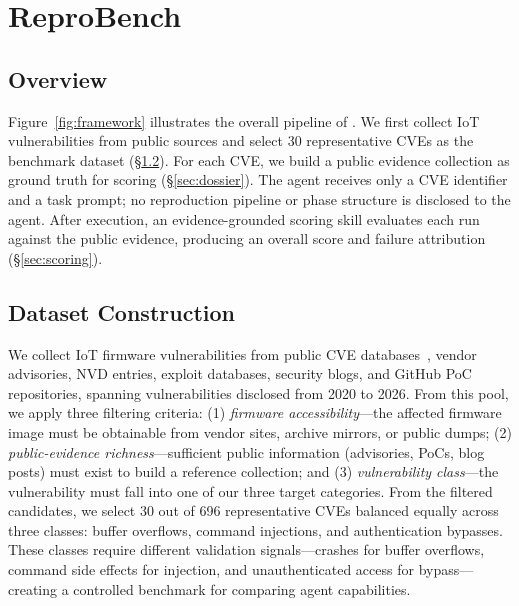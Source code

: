 \section{ReproBench}



\subsection{Overview}
Figure~\ref{fig:framework} illustrates the overall pipeline of \sys{}. We first collect IoT vulnerabilities from public sources and select 30 representative CVEs as the benchmark dataset (\S\ref{sec:dataset}). For each CVE, we build a public evidence collection as ground truth for scoring (\S\ref{sec:dossier}). The agent receives only a CVE identifier and a task prompt; no reproduction pipeline or phase structure is disclosed to the agent. After execution, an evidence-grounded scoring skill evaluates each run against the public evidence, producing an overall score and failure attribution (\S\ref{sec:scoring}).



\subsection{Dataset Construction}
\label{sec:dataset}
We collect IoT firmware vulnerabilities from public CVE databases~\cite{cveorg,cvedetails}, vendor advisories, NVD entries, exploit databases, security blogs, and GitHub PoC repositories, spanning vulnerabilities disclosed from 2020 to 2026. From this pool, we apply three filtering criteria: (1) \emph{firmware accessibility}---the affected firmware image must be obtainable from vendor sites, archive mirrors, or public dumps; (2) \emph{public-evidence richness}---sufficient public information (advisories, PoCs, blog posts) must exist to build a reference collection; and (3) \emph{vulnerability class}---the vulnerability must fall into one of our three target categories. From the filtered candidates, we select 30 out of 696 representative CVEs balanced equally across three classes: buffer overflows, command injections, and authentication bypasses. These classes require different validation signals---crashes for buffer overflows, command side effects for injection, and unauthenticated access for bypass---creating a controlled benchmark for comparing agent capabilities.

